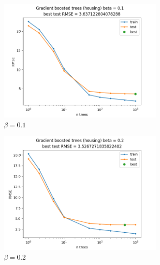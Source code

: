 \documentclass[12pt]{article}
\begin{document}
\newpage

\begin{figure}[!h]
    \centering
    \begin{subfigure}[b]{0.49\textwidth}
        \centering
        \includegraphics[width=0.9\textwidth]{plots/03/02-housing-0-1.png}
        \caption{$\beta = 0.1$}
        \label{fig:03-housing-0.1}
    \end{subfigure}
    \begin{subfigure}[b]{0.49\textwidth}
        \centering
        \includegraphics[width=0.9\textwidth]{plots/03/02-housing-0-2.png}
        \caption{$\beta = 0.2$}
        \label{fig:03-housing-0.2}
    \end{subfigure}
    \begin{subfigure}[b]{0.49\textwidth}
        \centering

\end{subfigure}
\end{figure}
\end{document}
